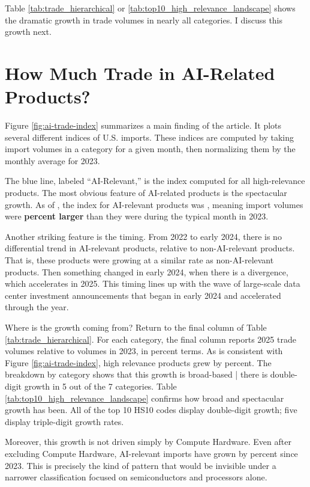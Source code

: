 \documentclass[12pt,pdftex]{article}
\begin{document}
\begin{onehalfspacing}
Table \ref{tab:trade_hierarchical} or \ref{tab:top10_high_relevance_landscape} shows the dramatic growth in trade volumes in nearly all categories. I discuss this growth next.

\section*{How Much Trade in AI-Related Products?}\label{sec:how-much-trade-ai}

Figure \ref{fig:ai-trade-index} summarizes a main finding of the article. It plots several different indices of U.S. imports. These indices are computed by taking import volumes in a category for a given month, then normalizing them by the monthly average for 2023. 

The blue line, labeled ``AI-Relevant,'' is the index computed for all high-relevance products. The most obvious feature of AI-related products is the spectacular growth. As of \lastObsDate{}, the index for AI-relevant products was \aiRelevantIndex{}, meaning import volumes were \textbf{\aiRelevantGrowth{} percent larger} than they were during the typical month in 2023. 

Another striking feature is the timing. From 2022 to early 2024, there is no differential trend in AI-relevant products, relative to non-AI-relevant products. That is, these products were growing at a similar rate as non-AI-relevant products. Then something changed in early 2024, when there is a divergence, which accelerates in 2025. This timing lines up with the wave of large-scale data center investment announcements that began in early 2024 and accelerated through the year.

Where is the growth coming from? Return to the final column of Table \ref{tab:trade_hierarchical}. For each category, the final column reports 2025 trade volumes relative to volumes in 2023, in percent terms. As is consistent with Figure \ref{fig:ai-trade-index}, high relevance products grew by \highAiPctChange{} percent. The breakdown by category shows that this growth is broad-based | there is double-digit growth in 5 out of the 7 categories. Table \ref{tab:top10_high_relevance_landscape} confirms how broad and spectacular growth has been. All of the top 10 HS10 codes display double-digit growth; five display triple-digit growth rates. 

Moreover, this growth is not driven simply by Compute Hardware. Even after excluding Compute Hardware, AI-relevant imports have grown by \aiRelevantExComputeGrowth{} percent since 2023. This is precisely the kind of pattern that would be invisible under a narrower classification focused on semiconductors and processors alone.


\end{onehalfspacing}
\end{document}
